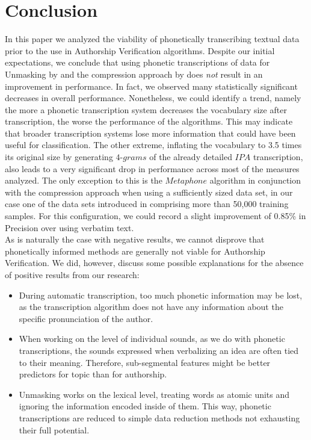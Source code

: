 \chapter{Conclusion}\label{conclusion}
In this paper we analyzed the viability of phonetically transcribing textual data prior to the use in Authorship Verification algorithms.
Despite our initial expectations, we conclude that using phonetic transcriptions of data for Unmasking by \cite{koppel2004unmasking} and the compression approach by \cite{teahan2003compression} does \textit{not} result in an improvement in performance.
In fact, we observed many statistically significant decreases in overall performance.
Nonetheless, we could identify a trend, namely the more a phonetic transcription system decreases the vocabulary size after transcription, the worse the performance of the algorithms.
This may indicate that broader transcription systems lose more information that could have been useful for classification.
The other extreme, inflating the vocabulary to 3.5 times its original size by generating $4$-$grams$ of the already detailed $IPA$ transcription, also leads to a very significant drop in performance across most of the measures analyzed.
The only exception to this is the $Metaphone$ algorithm in conjunction with the compression approach when using a sufficiently sized data set, in our case one of the data sets introduced in \cite{bevendorff2020overview} comprising more than 50,000 training samples.
For this configuration, we could record a slight improvement of 0.85\% in Precision over using verbatim text.\\
As is naturally the case with negative results, we cannot disprove that phonetically informed methods are generally not viable for Authorship Verification.
We did, however, discuss some possible explanations for the absence of positive results from our research:
\begin{itemize}
    \item During automatic transcription, too much phonetic information may be lost, as the transcription algorithm does not have any information about the specific pronunciation of the author.
    \item When working on the level of individual sounds, as we do with phonetic transcriptions, the sounds expressed when verbalizing an idea are often tied to their meaning. Therefore, sub-segmental features might be better predictors for topic than for authorship.
    \item Unmasking works on the lexical level, treating words as atomic units and ignoring the information encoded inside of them. This way, phonetic transcriptions are reduced to simple data reduction methods not exhausting their full potential.
\end{itemize}
